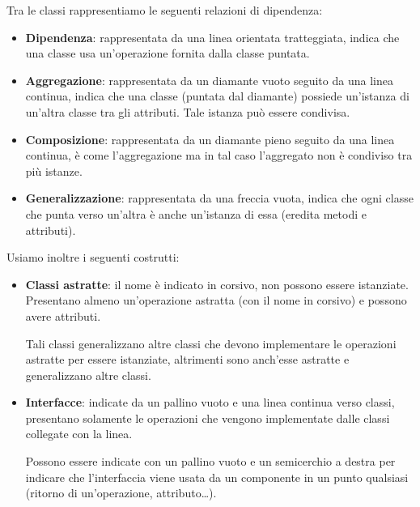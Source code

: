         Tra le classi rappresentiamo le seguenti relazioni di dipendenza:
        \begin{itemize}
            \item \textbf{Dipendenza}: rappresentata da una linea orientata tratteggiata, indica che una classe usa un'operazione fornita dalla classe puntata.
            \item \textbf{Aggregazione}: rappresentata da un diamante vuoto seguito da una linea continua, indica che una classe (puntata dal diamante) possiede un'istanza di un'altra classe tra gli attributi. Tale istanza può essere condivisa.
            \item \textbf{Composizione}: rappresentata da un diamante pieno seguito da una linea continua, è come l'aggregazione ma in tal caso l'aggregato non è condiviso tra più istanze.
            \item \textbf{Generalizzazione}: rappresentata da una freccia vuota, indica che ogni classe che punta verso un'altra è anche un'istanza di essa (eredita metodi e attributi).
        \end{itemize}
        Usiamo inoltre i seguenti costrutti:
            \begin{itemize}
                \item \textbf{Classi astratte}: il nome è indicato in corsivo, non possono essere istanziate. Presentano almeno un'operazione astratta (con il nome in corsivo) e possono avere attributi.\par
                Tali classi generalizzano altre classi che devono implementare le operazioni astratte per essere istanziate, altrimenti sono anch'esse astratte e generalizzano altre classi.
                \item \textbf{Interfacce}: indicate da un pallino vuoto e una linea continua verso classi, presentano solamente le operazioni che vengono implementate dalle classi collegate con la linea.\par
                Possono essere indicate con un pallino vuoto e un semicerchio a destra per indicare che l'interfaccia viene usata da un componente in un punto qualsiasi (ritorno di un'operazione, attributo\dots).
            \end{itemize}

